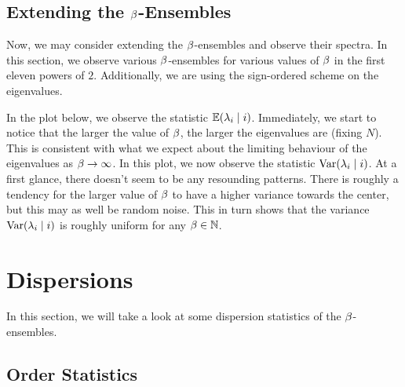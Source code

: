 \subsection{Extending the $\beta$-Ensembles}

Now, we may consider extending the $\beta$-ensembles and observe their spectra. In this section, we observe various $\beta$-ensembles for various values of $\beta$ in the first eleven powers of $2$. Additionally, we are using the sign-ordered scheme on the eigenvalues.

In the plot below, we observe the statistic $\mathbb{E}(\lambda_i \mid i)$. Immediately, we start to notice that the larger the value of $\beta$, the larger the eigenvalues are (fixing $N$). This is consistent with what we expect about the limiting behaviour of the eigenvalues as $\beta \to \infty$.
\trim
\trim
In this plot, we now observe the statistic $\text{Var}(\lambda_i \mid i)$. At a first glance, there doesn't seem to be any resounding patterns. There is roughly a tendency for the larger value of $\beta$ to have a higher variance towards the center, but this may as well be random noise. This in turn shows that the variance $\text{Var}(\lambda_i \mid i)$ is roughly uniform for any $\beta \in \mathbb{N}$.


\newpage
\section{Dispersions}

In this section, we will take a look at some dispersion statistics of the $\beta$-ensembles.

\subsection{Order Statistics}

